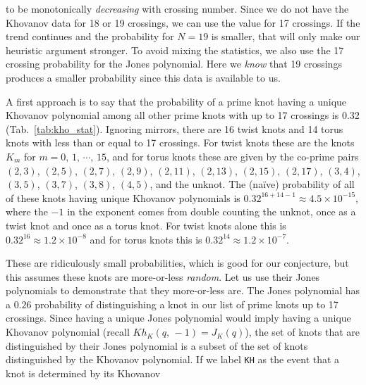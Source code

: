 \documentclass{article}
\theoremstyle{plain}
\begin{document}
        to be monotonically \textit{decreasing} with crossing number. Since
        we do not have the Khovanov data for 18 or 19 crossings, we can use
        the value for 17 crossings. If the trend continues and the probability
        for $N=19$ is smaller, that will only make our heuristic argument
        stronger. To avoid mixing the statistics, we also use the 17 crossing
        probability for the Jones polynomial. Here we \textit{know} that
        19 crossings produces a smaller probability since this data is
        available to us.
        \par\hfill\par
        A first approach is to say that the probability of a prime knot having a
        unique Khovanov polynomial among all other prime
        knots with up to 17 crossings is 0.32 (Tab.~\ref{tab:kho_stat}).
        Ignoring mirrors, there are 16 twist knots and 14 torus knots with
        less than or equal to 17 crossings. For twist knots these are the knots
        $K_{m}$ for $m=0,\,1,\,\cdots,\,15$, and for torus knots these are given
        by the co-prime pairs
        $(2, 3)$, $(2, 5)$, $(2, 7)$, $(2, 9)$, $(2, 11)$, $(2, 13)$,
        $(2, 15)$, $(2, 17)$, $(3, 4)$, $(3, 5)$, $(3, 7)$, $(3, 8)$, $(4, 5)$,
        and the unknot.
        The (na\"{i}ve) probability of all of these knots having unique
        Khovanov polynomials is $0.32^{16+14-1}\approx{4.5}\times{10}^{-15}$, where
        the $-1$ in the exponent comes from double counting the unknot, once as
        a twist knot and once as a torus knot.
        For twist knots alone this is $0.32^{16}\approx{1.2}\times{10}^{-8}$ and
        for torus knots this is $0.32^{14}\approx{1.2}\times{10}^{-7}$.
        \par\hfill\par
        These are ridiculously small probabilities, which is good for our
        conjecture,
        but this assumes these knots are more-or-less \textit{random}.
        Let us use their Jones polynomials to demonstrate that they more-or-less
        are. The Jones polynomial
        has a $0.26$ probability of distinguishing a knot in our list of prime knots
        up to 17 crossings. Since having a unique Jones polynomial would imply
        having a unique Khovanov polynomial (recall $Kh_{K}(q,\,-1)=J_{K}(q)$),
        the set of knots
        that are distinguished by their Jones polynomial is a subset of the set of
        knots distinguished by the Khovanov polynomial. If we label
        \texttt{KH} as the event that a knot is determined by its Khovanov
\end{document}
